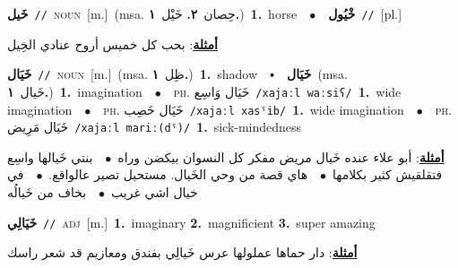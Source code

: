 \documentclass[10pt,a4paper,twoside]{article} %
\begin{document}
\begin{multicols}{2}
{\setlength\topsep{0pt}\textbf{\foreignlanguage{arabic}{خَيل}}\ {\color{gray}\texttt{//}\color{black}}\ \textsc{noun}\ [m.]\ \color{gray}(msa. \foreignlanguage{arabic}{حِصان}~\foreignlanguage{arabic}{\textbf{٢.}}  \foreignlanguage{arabic}{خَيْل}~\foreignlanguage{arabic}{\textbf{١.}})\color{black}\ \textbf{1.}~horse\ \ $\bullet$\ \ \setlength\topsep{0pt}\textbf{\foreignlanguage{arabic}{خْيُول}}\ {\color{gray}\texttt{//}\color{black}}\ [pl.]\  \begin{flushright}\color{gray}\foreignlanguage{arabic}{\textbf{\underline{\foreignlanguage{arabic}{أمثلة}}}: بحب كل خميس أروح عنادي الخِيل}\end{flushright}\color{black}} \vspace{2mm}

{\setlength\topsep{0pt}\textbf{\foreignlanguage{arabic}{خَيَال}}\ {\color{gray}\texttt{//}\color{black}}\ \textsc{noun}\ [m.]\ \color{gray}(msa. \foreignlanguage{arabic}{ظِل}~\foreignlanguage{arabic}{\textbf{١.}})\color{black}\ \textbf{1.}~shadow\ \ $\smblkdiamond$\ \ \setlength\topsep{0pt}\textbf{\foreignlanguage{arabic}{خَيَال}}\ \color{gray}(msa. \foreignlanguage{arabic}{خَيال}~\foreignlanguage{arabic}{\textbf{١.}})\color{black}\ \textbf{1.}~imagination\ \ $\bullet$\ \ \textsc{ph.} \color{gray} \foreignlanguage{arabic}{خَيَال وَاسِع}\color{black}\ {\color{gray}\texttt{/{\sffamily xajaːl waːsiʕ}/}\color{black}}\ \textbf{1.}~wide imagination\ \ $\bullet$\ \ \textsc{ph.} \color{gray} \foreignlanguage{arabic}{خَيَال خَصِب}\color{black}\ {\color{gray}\texttt{/{\sffamily xajaːl xasˤib}/}\color{black}}\ \textbf{1.}~wide imagination\ \ $\bullet$\ \ \textsc{ph.} \color{gray} \foreignlanguage{arabic}{خَيَال مَرِيض}\color{black}\ {\color{gray}\texttt{/{\sffamily xajaːl mariː(dˤ)}/}\color{black}}\ \textbf{1.}~sick-mindedness\  \begin{flushright}\color{gray}\foreignlanguage{arabic}{\textbf{\underline{\foreignlanguage{arabic}{أمثلة}}}: أبو علاء عنده خَيال مريض مفكر كل النسوان بيكضن وراه\ $\bullet$\ \  بنتي خَيالها واسِع فتقلقيش كثير بكلامها\ $\bullet$\ \  هاي قصة من وحي الخَيال. مستحيل تصير عالواقع.\ $\bullet$\ \  في خيال اشي غريب\ $\bullet$\ \  بخاف من خَيالُه}\end{flushright}\color{black}} \vspace{2mm}

{\setlength\topsep{0pt}\textbf{\foreignlanguage{arabic}{خَيَالِي}}\ {\color{gray}\texttt{//}\color{black}}\ \textsc{adj}\ [m.]\ \textbf{1.}~imaginary  \textbf{2.}~magnificient  \textbf{3.}~super amazing\  \begin{flushright}\color{gray}\foreignlanguage{arabic}{\textbf{\underline{\foreignlanguage{arabic}{أمثلة}}}: دار حماها عملولها عرس خَيالِي بفندق ومعازيم قد شعر راسك}\end{flushright}\color{black}} \vspace{2mm}


\end{multicols}
\end{document}
